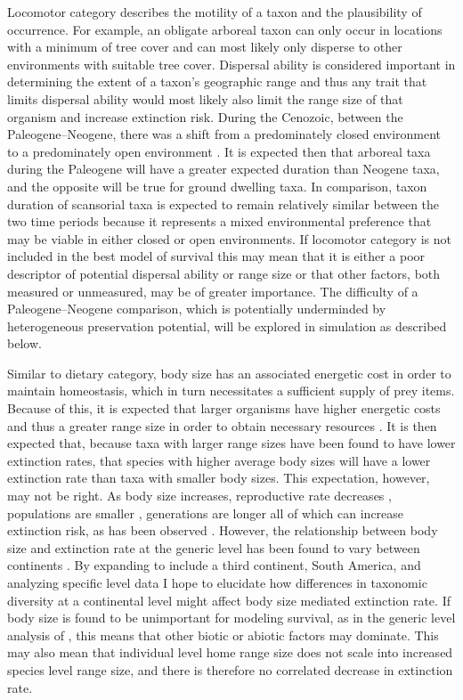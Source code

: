 \documentclass[12pt,letterpaper]{article}
\begin{document}
Locomotor category describes the motility of a taxon and the plausibility of occurrence. For example, an obligate arboreal taxon can only occur in locations with a minimum of tree cover and can most likely only disperse to other environments with suitable tree cover. Dispersal ability is considered important in determining the extent of a taxon's geographic range \citep{Birand2012,Jablonski2006a,Gaston2009} and thus any trait that limits dispersal ability would most likely also limit the range size of that organism and increase extinction risk. During the Cenozoic, between the Paleogene--Neogene, there was a shift from a predominately closed environment to a predominately open environment \citep{Janis1993a,Blois2009,Rose2006}. It is expected then that arboreal taxa during the Paleogene will have a greater expected duration than Neogene taxa, and the opposite will be true for ground dwelling taxa. In comparison, taxon duration of scansorial taxa is expected to remain relatively similar between the two time periods because it represents a mixed environmental preference that may be viable in either closed or open environments. If locomotor category is not included in the best model of survival this may mean that it is either a poor descriptor of potential dispersal ability or range size or that other factors, both measured or unmeasured, may be of greater importance. The difficulty of a Paleogene--Neogene comparison, which is potentially underminded by heterogeneous preservation potential, will be explored in simulation as described below.

Similar to dietary category, body size has an associated energetic cost in order to maintain homeostasis, which in turn necessitates a sufficient supply of prey items. Because of this, it is expected that larger organisms have higher energetic costs and thus a greater range size in order to obtain necessary resources \citep{Damuth1979,Brown1987,Damuth1979,Lyons2010}. It is then expected that, because taxa with larger range sizes have been found to have lower extinction rates, that species with higher average body sizes will have a lower extinction rate than taxa with smaller body sizes. This expectation, however, may not be right. As body size increases, reproductive rate decreases \citep{Johnson2002b}, populations are smaller \citep{White2007}, generations are longer \citep{Martin1993a} all of which can increase extinction risk, as has been observed \citep{Liow2008,Davidson2012}. However, the relationship between body size and extinction rate at the generic level has been found to vary between continents \citep{Tomiya2013,Liow2008}. By expanding to include a third continent, South America, and analyzing specific level data I hope to elucidate how differences in taxonomic diversity at a continental level might affect body size mediated extinction rate. If body size is found to be unimportant for modeling survival, as in the generic level analysis of \citet{Tomiya2013}, this means that other biotic or abiotic factors may dominate. This may also mean that individual level home range size does not scale into increased species level range size, and there is therefore no correlated decrease in extinction rate. 
\end{document}
